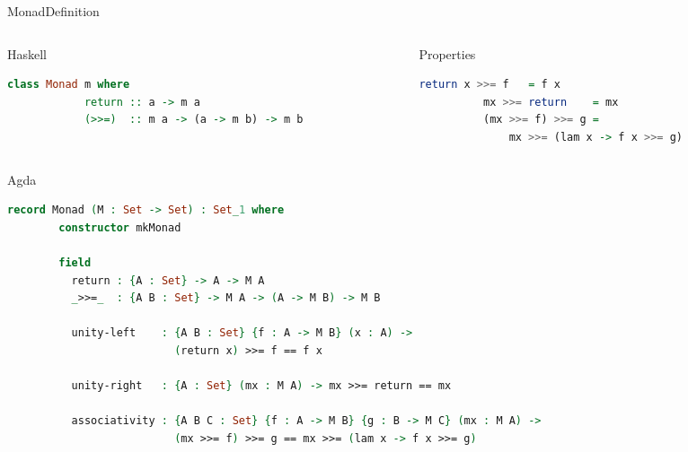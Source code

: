 \documentclass{beamer}
\begin{document}
\begin{frame}[fragile]{Monad}{Definition}
  \begin{columns}[t]
    \begin{column}{.5\textwidth}
      \begin{block}{Haskell}
        \begin{lstlisting}[language=Haskell, mathescape]
          class Monad m where
            return :: a -> m a
            (>>=)  :: m a -> (a -> m b) -> m b
        \end{lstlisting}
      \end{block}
    \end{column}

    \begin{column}{.5\textwidth}
      \pause
      \begin{block}{Properties}
        \begin{lstlisting}[language=Haskell, mathescape]
          return x >>= f   = f x
          mx >>= return    = mx
          (mx >>= f) >>= g =
              mx >>= (lam x -> f x >>= g)
        \end{lstlisting}
      \end{block}
    \end{column}
  \end{columns}

  \pause
  \begin{block}{Agda\footnotemark[4]}
    \begin{lstlisting}[language=Agda, mathescape]
      record Monad (M : Set -> Set) : Set_1 where
        constructor mkMonad

        field
          return : {A : Set} -> A -> M A
          _>>=_  : {A B : Set} -> M A -> (A -> M B) -> M B

          unity-left    : {A B : Set} {f : A -> M B} (x : A) ->
                          (return x) >>= f == f x

          unity-right   : {A : Set} (mx : M A) -> mx >>= return == mx

          associativity : {A B C : Set} {f : A -> M B} {g : B -> M C} (mx : M A) ->
                          (mx >>= f) >>= g == mx >>= (lam x -> f x >>= g)
    \end{lstlisting}
  \end{block}
\end{frame}
\end{document}
